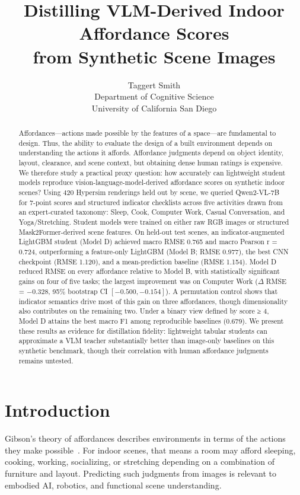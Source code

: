 \documentclass[10pt,twocolumn]{article}
\title{Distilling VLM-Derived Indoor Affordance Scores\\
from Synthetic Scene Images}
\author{%
  Taggert Smith\\
  Department of Cognitive Science\\
  University of California San Diego
}
\begin{document}
\maketitle

\begin{abstract}
Affordances—actions made possible by the features of a space—are fundamental to design. 
Thus, the ability to evaluate the design of a built environment depends on understanding the actions it affords.
Affordance judgments depend on object identity, layout, clearance, and scene
context, but obtaining dense human ratings is expensive. We therefore study a
practical proxy question: how accurately can lightweight student models
reproduce vision-language-model-derived affordance scores on synthetic indoor
scenes?
Using 420 Hypersim renderings held out by scene, we queried Qwen2-VL-7B for 7-point scores and structured indicator checklists across five activities drawn from an expert-curated taxonomy: Sleep, Cook, Computer Work, Casual Conversation, and Yoga/Stretching. Student models were trained on either raw RGB images or structured Mask2Former-derived scene features. On held-out test scenes, an indicator-augmented LightGBM student (Model D) achieved macro RMSE 0.765 and macro Pearson r = 0.724, outperforming a feature-only LightGBM (Model B; RMSE 0.977), the best CNN checkpoint (RMSE 1.120), and a mean-prediction baseline (RMSE 1.154). Model D reduced RMSE on every affordance relative to Model B, with statistically significant gains on four of five tasks; the largest improvement was on Computer Work ($\Delta$ RMSE = −0.328, 95\% bootstrap CI $[−0.500, −0.154]$). A permutation control shows that indicator semantics drive most of this gain on three affordances, though dimensionality also contributes on the remaining two. Under a binary view defined by score ≥ 4, Model D attains the best macro F1 among reproducible baselines (0.679). We present these results as evidence for distillation fidelity: lightweight tabular students can approximate a VLM teacher substantially better than image-only baselines on this synthetic benchmark, though their correlation with human affordance judgments remains untested.

\end{abstract}

\section{Introduction}
\label{sec:intro}

Gibson's theory of affordances describes environments in terms of the actions
they make possible~\cite{Gibson1979}. For indoor scenes, that means a room may
afford sleeping, cooking, working, socializing, or stretching depending on a
combination of furniture and layout. Predicting such judgments from images is
relevant to embodied AI, robotics, and functional scene understanding.
\end{document}
